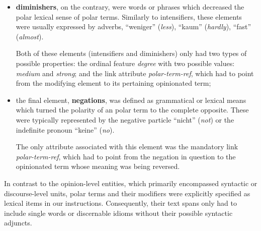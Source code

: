 \begin{itemize}
\item
  \textbf{diminishers}, on the contrary, were words or phrases which
  decreased the polar lexical sense of polar terms.
  Similarly to intensifiers, these elements were usually expressed by
  adverbs, \eg{} ``weniger'' (\emph{less}), ``kaum'' (\emph{hardly}),
  ``fast'' (\emph{almost}).

  Both of these elements (intensifiers and diminishers) only had two
  types of possible properties: the ordinal feature \emph{degree} with
  two possible values: \emph{medium} and \emph{strong}; and the link
  attribute \emph{polar-term-ref}, which had to point from the
  modifying element to its pertaining opinionated term;

\item the final element, \textbf{negations}, was defined as
  grammatical or lexical means which turned the polarity of an polar
  term to the complete opposite.  These were typically represented by
  the negative particle ``nicht'' (\emph{not}) or the indefinite
  pronoun ``keine'' (\emph{no}).

  The only attribute associated with this element was the mandatory
  link \emph{polar-term-ref}, which had to point from the negation
  in question to the opinionated term whose meaning was being
  reversed.
\end{itemize}

In contrast to the opinion-level entities, which primarily encompassed
syntactic or discourse-level units, polar terms and their
modifiers were explicitly specified as lexical items in our
instructions.  Consequently, their text spans only had to include
single words or discernable idioms without their possible syntactic
adjuncts.

